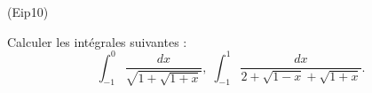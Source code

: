 \begin{tiny}(Eip10)\end{tiny}
Calculer les int{\'e}grales suivantes :
\[
\int_{-1}^{0}\frac{dx}{\sqrt{1+\sqrt{1+x}}},\;
\int_{-1}^{1}\frac{dx}{2+\sqrt{1-x}+\sqrt{1+x}}.
\]